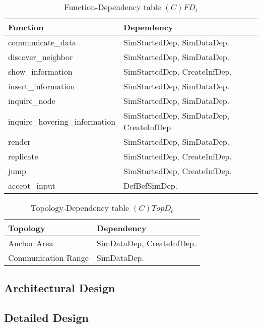 \begin{table}[H]
	\centering
	\begin{tabular}{|p{5cm}|p{7cm}|}
			\hline
			\textbf{Function} & \textbf{Dependency} \\
			\hline
			communicate\_data & SimStartedDep, SimDataDep.\\
			\hline
			discover\_neighbor & SimStartedDep, SimDataDep.\\
			\hline
			show\_information & SimStartedDep, CreateInfDep.\\
			\hline
			insert\_information & SimStartedDep, SimDataDep.\\
			\hline
			inquire\_node & SimStartedDep, SimDataDep.\\
			\hline
			inquire\_hovering\_information & SimStartedDep, SimDataDep, CreateInfDep.\\
			\hline
			render & SimStartedDep, SimDataDep. \\
			\hline
			replicate & SimStartedDep, CreateInfDep. \\
			\hline
			jump & SimStartedDep, CreateInfDep. \\
			\hline
			accept\_input & DefBefSimDep. \\
			\hline
		\end{tabular}
	\caption{Function-Dependency table $(C)FD_t$}
	\label{tab:cfdt}
\end{table}

\begin{table}[H]
	\centering
	\begin{tabular}{|p{4cm}|p{8cm}|}
			\hline
			\textbf{Topology} & \textbf{Dependency} \\
			\hline
			Anchor Area & SimDataDep, CreateInfDep.\\
			\hline
			Communication Range & SimDataDep. \\
			\hline
		\end{tabular}
	\caption{Topology-Dependency table $(C)TopD_t$}
	\label{tab:ctopdt}
\end{table}

\subsection{Architectural Design}

\subsection{Detailed Design}

